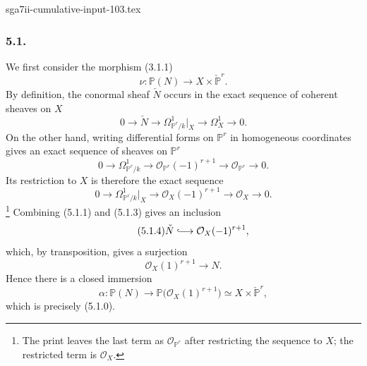 \begin{filecontents*}{sga7ii-cumulative-input-103.tex}
\subsubsection*{5.1.}
We first consider the morphism (3.1.1)
\begin{equation}\tag{5.1.0}
\nu:\mathbb P(N)\longrightarrow X\times\check{\mathbb P}^{r}.
\end{equation}
By definition, the conormal sheaf $\check N$ occurs in the exact
sequence of coherent sheaves on $X$
\begin{equation}\tag{5.1.1}
0\longrightarrow\check N
\longrightarrow\Omega^1_{\mathbb P^r/k}|_X
\longrightarrow\Omega^1_X
\longrightarrow0.
\end{equation}
On the other hand, writing differential forms on $\mathbb P^r$ in
homogeneous coordinates gives an exact sequence of sheaves on
$\mathbb P^r$
\begin{equation}\tag{5.1.2}
0\longrightarrow\Omega^1_{\mathbb P^r/k}
\longrightarrow\mathcal O_{\mathbb P^r}(-1)^{r+1}
\longrightarrow\mathcal O_{\mathbb P^r}
\longrightarrow0.
\end{equation}
Its restriction to $X$ is therefore the exact sequence
\begin{equation}\tag{5.1.3}
0\longrightarrow\Omega^1_{\mathbb P^r/k}|_X
\longrightarrow\mathcal O_X(-1)^{r+1}
\longrightarrow\mathcal O_X
\longrightarrow0.
\end{equation}
\footnote{The print leaves the last term as
$\mathcal O_{\mathbb P^r}$ after restricting the sequence to $X$;
the restricted term is $\mathcal O_X$.}
Combining (5.1.1) and (5.1.3) gives an inclusion
\begin{equation}\tag{5.1.4}
\check N\lhook\joinrel\longrightarrow\mathcal O_X(-1)^{r+1},
\end{equation}
which, by transposition, gives a surjection
\begin{equation}\tag{5.1.5}
\mathcal O_X(1)^{r+1}\longrightarrow N.
\end{equation}
Hence there is a closed immersion
\begin{equation}\tag{5.1.6}
\alpha:\mathbb P(N)
\longrightarrow\mathbb P\bigl(\mathcal O_X(1)^{r+1}\bigr)
\simeq X\times\check{\mathbb P}^{r},
\end{equation}
which is precisely (5.1.0).

\end{filecontents*}
